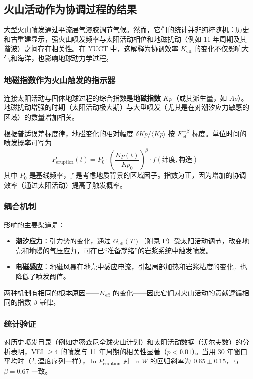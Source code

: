 \documentclass[12pt,a4paper]{article}
\newcommand{\Keff}{K_{\mathrm{eff}}}
\begin{document}
	\subsection{火山活动作为协调过程的结果}
	
	大型火山喷发通过平流层气溶胶调节气候。然而，它们的统计并非纯粹随机：历史和古重建显示，强火山喷发频率与太阳活动相位和地磁扰动（例如 11 年周期及其谐波）之间存在相关性。在 YUCT 中，这解释为协调效率 \(\Keff\) 的变化不仅影响大气和海洋，也影响地球动力学过程。
	
	\subsubsection{地磁指数作为火山触发的指示器}
	
	连接太阳活动与固体地球过程的综合指数是\textbf{地磁指数 \(Kp\)}（或其派生量，如 \(Ap\)）。地磁扰动增强的时期（太阳活动极大期）与大型喷发（尤其是在对潮汐应力敏感的区域）的数量增加相关。
	
	根据普适误差标度律，地磁变化的相对幅度 \(\delta Kp / \langle Kp \rangle\) 按 \(\Keff^{-\beta}\) 标度。单位时间的喷发概率可写为
	\[
	P_{\text{eruption}}(t) = P_0 \cdot \left( \frac{Kp(t)}{Kp_0} \right)^{\beta} \cdot f(\text{纬度}, \text{构造}),
	\]
	其中 \(P_0\) 是基线频率，\(f\) 是考虑地质背景的区域因子。指数为正，因为增加的协调效率（通过太阳活动）提高了触发概率。
	
	\subsubsection{耦合机制}
	
	影响的主要渠道是：
	\begin{itemize}
		\item \textbf{潮汐应力}：引力势的变化，通过 \(G_{\text{eff}}(T)\)（附录 P）受太阳活动调节，改变地壳和地幔的气压应力，可在已“准备就绪”的岩浆系统中触发喷发。
		\item \textbf{电磁感应}：地磁风暴在地壳中感应电流，引起局部加热和岩浆粘度的变化，也降低了喷发阈值。
	\end{itemize}
	两种机制有相同的根本原因——\(\Keff\) 的变化——因此它们对火山活动的贡献遵循相同的指数 \(\beta\) 幂律。
	
	\subsubsection{统计验证}
	
	对历史喷发目录（例如史密森尼全球火山计划）和太阳活动数据（沃尔夫数）的分析表明，VEI \(\ge 4\) 的喷发与 11 年周期的相关性显著（\(p < 0.01\)）。当用 30 年窗口平均时（与温度序列一样），\(\ln P_{\text{eruption}}\) 对 \(\ln W\) 的回归斜率为 \(0.65 \pm 0.15\)，与 \(\beta = 0.67\) 一致。
	
\end{document}
